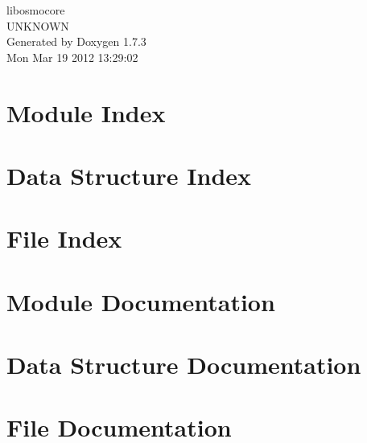 \documentclass[a4paper]{book}
\begin{document}
\begin{titlepage}
\vspace*{7cm}
\begin{center}
{\Large libosmocore \\[1ex]\large UNKNOWN }\\
\vspace*{1cm}
{\large Generated by Doxygen 1.7.3}\\
\vspace*{0.5cm}
{\small Mon Mar 19 2012 13:29:02}\\
\end{center}
\end{titlepage}
\clearemptydoublepage
{}
\tableofcontents
\clearemptydoublepage
{}
\chapter{Module Index}

\chapter{Data Structure Index}

\chapter{File Index}

\chapter{Module Documentation}

\chapter{Data Structure Documentation}




\chapter{File Documentation}








\printindex
\end{document}
